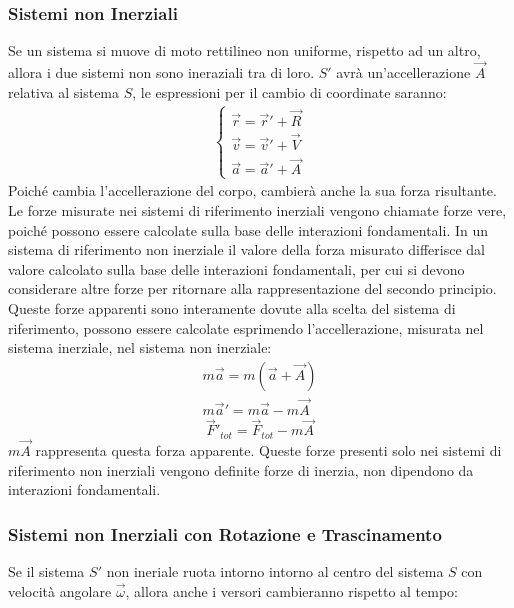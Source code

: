 \documentclass{article}
\numberwithin{equation}{subsection}
\begin{document}
\subsubsection{Sistemi non Inerziali}
Se un sistema si muove di moto rettilineo non uniforme, 
rispetto ad un altro, allora i due sistemi non sono ineraziali tra di loro. 
$S'$ avrà un'accellerazione $\vec A$ relativa al sistema $S$, 
le espressioni per il cambio di coordinate saranno:
\begin{gather}
    \begin{cases}
        \vec{r}=\vec{r}'+\vec{R}\\
        \vec{v}=\vec{v}'+\vec{V}\\
        \vec{a}=\vec{a}'+\vec{A}
    \end{cases}
\end{gather}
Poiché cambia l'accellerazione del corpo, cambierà anche 
la sua forza risultante. Le forze misurate 
nei sistemi di riferimento inerziali vengono chiamate forze vere, poiché possono essere calcolate sulla base delle interazioni fondamentali. In un sistema di riferimento non 
inerziale il valore della forza misurato differisce dal valore calcolato sulla base delle interazioni fondamentali, per cui si devono considerare altre forze per ritornare 
alla rappresentazione del secondo principio. Queste forze apparenti sono interamente dovute alla scelta del sistema di riferimento, possono essere calcolate esprimendo 
l'accellerazione, misurata nel sistema inerziale, nel sistema non inerziale:  
\begin{gather*}
    m\vec{a}=m(\vec{a}+\vec{A})\\
    m\vec{a}'=m\vec{a}-m\vec{A}
\end{gather*}
\begin{equation}
    \vec{F}'_{tot}=\vec{F}_{tot}-m\vec{A}
\end{equation}
$m\vec{A}$ rappresenta questa forza apparente. Queste forze presenti solo nei sistemi di riferimento non inerziali vengono definite forze di inerzia, non dipendono 
da interazioni fondamentali.  

\subsubsection{Sistemi non Inerziali con Rotazione e Trascinamento}
Se il sistema $S'$ non ineriale ruota intorno intorno al centro del 
sistema $S$ con velocità angolare $\vec{\omega}$, allora anche i versori 
cambieranno rispetto al tempo:
\end{document}
